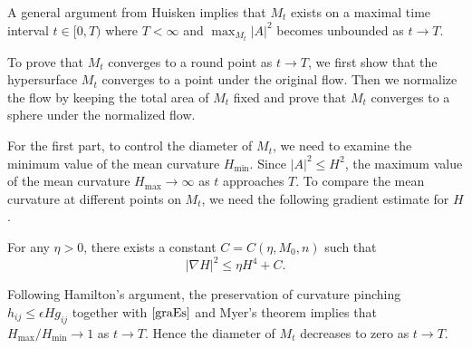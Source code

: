 A general argument from Huisken implies that $M_t$ exists on a maximal time interval $t \in [0,T)$ where $T<\infty $ and $\max_{M_t}\left| A \right| ^2 $ becomes unbounded as $t \to T$.

To prove that $M_t$ converges to a round point as $t \to T$, we first show that the hypersurface $M_t$ converges to a point under the original flow. Then we normalize the flow by keeping the total area of $M_t$ fixed and prove that $M_t$ converges to a sphere under the normalized flow.

For the first part, to control the diameter of $M_t$, we need to examine the minimum value of the mean curvature $H_{\min }$. Since $\left| A \right| ^2 \leq H^2$, the maximum value of the mean curvature $H_{\max } \to \infty$ as $t$ approaches $T$. To compare the mean curvature at different points on $M_t$, we need the following gradient estimate for $H$.

\begin{theorem} \label{graEs}
	For any $\eta >0$, there exists a constant $C=C(\eta ,M_0,n)$ such that 
	\[\left| \nabla H \right| ^2 \leq \eta H^4 + C.\]
\end{theorem}

Following Hamilton's argument, the preservation of curvature pinching $h_{ij }^{} \leq \epsilon H g_{ij }^{} $ together with $\autoref{graEs}$ and Myer's theorem implies that $H_{\max }/H_{\min } \to 1$ as $t \to T$. Hence the diameter of $M_t$ decreases to zero as $t \to T.$ 

